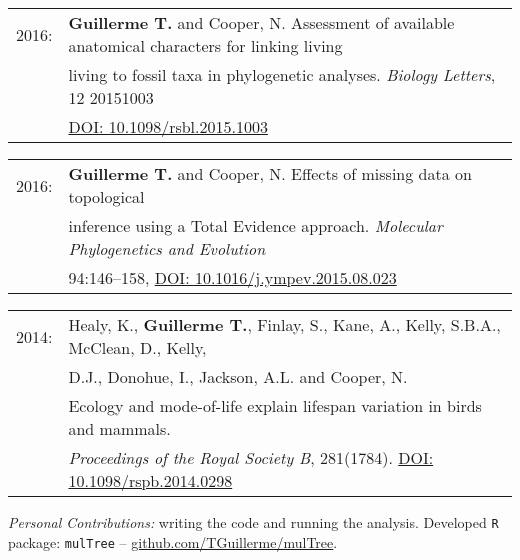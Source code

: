 \documentclass[10pt,a4paper]{article}
\begin{document}
{\bigskip

\begin{tabular}{ll}
2016: &\textbf{Guillerme T.} and Cooper, N. Assessment of available anatomical characters for linking living\\
& living to fossil taxa in phylogenetic analyses. \textit{Biology Letters}, 12 20151003\\
& \href{http://rsbl.royalsocietypublishing.org/content/12/5/20151003}{DOI: 10.1098/rsbl.2015.1003}\\ %
\end{tabular}

\bigskip

\begin{tabular}{ll}
2016: & \textbf{Guillerme T.} and Cooper, N. Effects of missing data on topological\\
& inference using a Total Evidence approach. \textit{Molecular Phylogenetics and Evolution}\\
&  94:146–158, \href{http://goo.gl/bVGrQJ}{DOI: 10.1016/j.ympev.2015.08.023}\\
\end{tabular}

\bigskip

\begin{tabular}{ll}
2014: & Healy, K., \textbf{Guillerme T.}, Finlay, S., Kane, A., Kelly, S.B.A., McClean, D., Kelly, \\
& D.J., Donohue, I., Jackson, A.L. and Cooper, N. \\
& Ecology and mode-of-life explain lifespan variation in birds and mammals.\\
& \textit{Proceedings of the Royal Society B}, 281(1784). \href{http://rspb.royalsocietypublishing.org/content/281/1784/20140298}{DOI: 10.1098/rspb.2014.0298}\\ %
\end{tabular}

\textit{Personal Contributions:} writing the code and running the analysis. Developed \texttt{R} package: \texttt{mulTree} -- \href{https://github.com/TGuillerme/mulTree}{github.com/TGuillerme/mulTree}.
\bigskip


}
\end{document}
